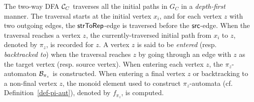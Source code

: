\documentclass{llncs}
\begin{document}



The two-way DFA $\mathcal{C}_C$ traverses all the initial paths in $G_C$ in a \emph{depth-first} manner. The traversal starts at the initial vertex $x_i$, and for each vertex $z$ with two outgoing edges, the $\mathsf{strToRep}$-edge is traversed before the $\mathsf{src}$-edge.  When the traversal reaches a vertex $z$, the currently-traversed initial path from $x_i$ to $z$, denoted by $\pi_z$, is recorded for $z$.
A vertex $z$ is said to be \emph{entered} (resp. \emph{backtracked to}) when the traversal reaches $z$ by going through an edge with $z$ as the target vertex (resp. source vertex). When entering each vertex $z$, the $\pi_z$-automaton $\mathcal{B}_{\pi_z}$ is constructed. When entering a final vertex $z$ or backtracking to a non-final vertex $z$, the monoid element used to construct $\pi_z$-automata  (cf. Definition~\ref{def-pi-aut}), denoted by $f_{\pi_z}$, is computed. 
\end{document}
